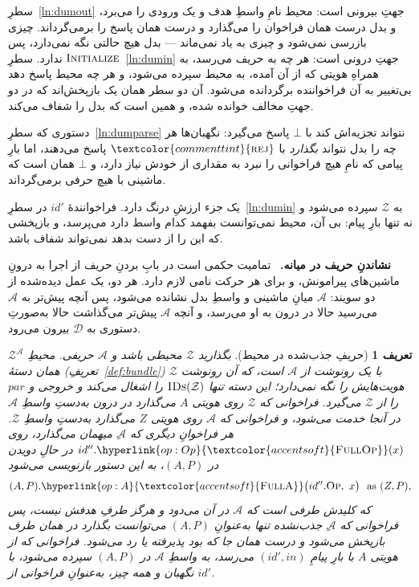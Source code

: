 \documentclass[10pt,oneside,openany]{book}
\newcommand{\pars}{\mathit{par}}
\newcommand{\Zenv}{\mathcal{Z}}
\newcommand{\Adv}{\mathcal{A}}
\newcommand{\Dum}{\mathcal{D}}
\newcommand{\op}[1]{\textnormal{\textsc{#1}}}
\newcommand{\fopl}[1]{\hyperlink{op:#1}{\textcolor{accentsoft}{\op{Full}\op{#1}}}}
\newcommand{\IDs}{\op{IDs}}
\newcommand{\id}{id}
\newcommand{\atom}[1]{\textcolor{commenttint}{\op{#1}}}
\newcommand{\rej}{\atom{rej}}
\newcommand{\none}{\bot}
\newcommand{\Op}{\op{Op}}
\newcommand{\heading}[1]{\medskip\par\noindent\textcolor{accent}{\textbf{#1.}}\ }
\theoremstyle{accentdef}
\newtheorem{definition}{تعریف}[chapter]
\theoremstyle{accentplain}
\begin{document}
سطرِ~\ref{ln:dumout} جهتِ بیرونی است: محیط نامِ واسطِ هدف و یک ورودی را
می‌برد، و بدل درست همان فراخوان را می‌گذارد و درست همان پاسخ را
برمی‌گرداند. چیزی بازرسی نمی‌شود و چیزی به یاد نمی‌ماند --- بدل هیچ حالتی
نگه نمی‌دارد، پس $\op{Initialize}$ ندارد. سطرِ~\ref{ln:dumin} جهتِ درونی
است: هر چه به حریف می‌رسد، به همراهِ هویتی که از آن آمده، به محیط سپرده
می‌شود، و هر چه محیط پاسخ دهد بی‌تغییر به آن فراخواننده برگردانده می‌شود.
آن دو سطر همان یک بازپخش‌اند که در دو جهتِ مخالف خوانده شده، و همین است که
بدل را شفاف می‌کند.

دستوری که سطرِ~\ref{ln:dumparse} نتواند تجزیه‌اش کند با $\none$ پاسخ
می‌گیرد: نگهبان‌ها هر چه را بدل نتواند \emph{بگذارد} با $\rej$ پاسخ
می‌دهند، اما بارِ پیامی که نامِ هیچ فراخوانی را نبرد به مقداری از خودش
نیاز دارد، و $\none$ همان است که ماشینی با هیچ حرفی برمی‌گرداند.

یک جزء ارزشِ درنگ دارد. فراخوانندهٔ $\id'$ در سطرِ~\ref{ln:dumin} به
$\Zenv$ سپرده می‌شود و نه تنها بارِ پیام: بی آن، محیط نمی‌توانست بفهمد
کدام واسط دارد می‌پرسد، و بازپخشی که این را از دست بدهد نمی‌تواند شفاف
باشد.

\heading{نشاندنِ حریف در میانه} تمامیت حکمی است در بابِ بردنِ حریف از اجرا
به درونِ ماشین‌های پیرامونش، و برای هر حرکت نامی لازم دارد. هر دو، یک عمل
دیده‌شده از دو سویند: $\Adv$ میانِ ماشینی و واسطِ بدل نشانده می‌شود، پس
آنچه پیش‌تر به $\Adv$ می‌رسید حالا در درون به او می‌رسد، و آنچه $\Adv$
پیش‌تر می‌گذاشت حالا به‌صورتِ دستوری به $\Dum$ بیرون می‌رود.

\begin{definition}[حریفِ جذب‌شده در محیط]\label{def:zadv}
بگذارید $\Zenv$ محیطی باشد و $\Adv$ حریفی. محیطِ $\Zenv^{\Adv}$ همان دستهٔ
(تعریفِ~\ref{def:bundle}) $\Zenv$ با یک رونوشت از $\Adv$ است، که آن رونوشت
هویت‌هایش را نگه \emph{نمی‌دارد}؛ این دسته تنها $\IDs(\Zenv)$ را اشغال
می‌کند و خروجی و $\pars$ را از $\Zenv$ می‌گیرد. فراخوانی که $\Zenv$ روی
هویتی $A$ می‌گذارد در درون به‌دستِ واسطِ $\Adv$ در آنجا خدمت می‌شود، و
فراخوانی که $\Adv$ روی هویتی $Z$ می‌گذارد به‌دستِ واسطِ $\Zenv$. هر
فراخوانِ دیگری که $\Adv$ِ میهمان می‌گذارد، روی $\id''.\fopl{Op}(x)$ در
حالِ دویدن در $(A,P)$، به این دستور بازنویسی می‌شود
\[
  (A,P).\fopl{A}\bigl(\id''.\Op,\ x\bigr) \ \text{ as } (Z,P) ,
\]
که کلیدش طرفی است که $\Adv$ در آن می‌دود و هرگز طرفِ هدفش نیست، پس
فراخوانی که $\Adv$ِ جذب‌نشده تنها به‌عنوانِ $(A,P)$ می‌توانست بگذارد در
همان طرف بازپخش می‌شود و درست همان جا که بود پذیرفته یا رد می‌شود.
فراخوانی که از هویتی $A$ با بارِ پیامِ $(\id',in)$ می‌رسد، به واسطِ $\Adv$
در $(A,P)$ سپرده می‌شود، با نگهبان و همه چیز، به‌عنوانِ فراخوانی از
$\id'$.
\end{definition}
\end{document}
